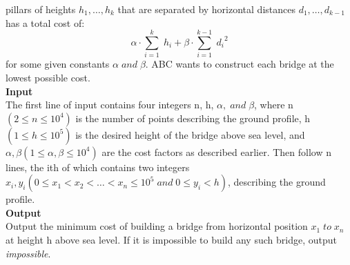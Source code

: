 \documentclass{report}
\begin{document}
pillars of heights $h_1,\dots,h_k$ that are separated by horizontal distances $d_1,\ldots,d_{k−1}$ has a total cost of:
\begin{equation}
\alpha \cdot \sum_{i=1}^{k}\;h_i + \beta \cdot \sum_{i=1}^{k-1}\; {d_i}^2
\end{equation}
for some given constants $\alpha\; and\; \beta$. ABC wants to construct each bridge at the lowest possible cost.\\
{\bf Input}\\
The first line of input contains four integers n, h, $\alpha, \;and\; \beta$, where n $(2 \leq n \leq 10^4)$ is the number of
points describing the ground profile, h $(1 \leq h \leq 10^5)$ is the desired height of the bridge above sea level,
and $\alpha, \beta (1 \leq \alpha, \beta \leq 10^4)$ are the cost factors as described earlier. Then follow n lines, the ith of which
contains two integers $x_i, y_i (0 ≤ x_1 < x_2 < \ldots < x_n \leq 10^5 \;and\; 0 \leq y_i < h)$, describing the ground
profile.\\
{\bf Output}\\
Output the minimum cost of building a bridge from horizontal position $x_1\; to\; x_n$ at height h above sea
level. If it is impossible to build any such bridge, output {\it impossible}.\\
\end{document}
